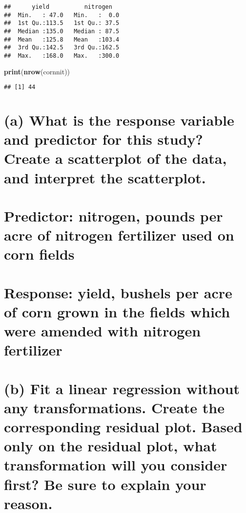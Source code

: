 \documentclass[
]{article}
\newenvironment{Shaded}{\begin{snugshade}}{\end{snugshade}}
\newcommand{\KeywordTok}[1]{\textcolor[rgb]{0.13,0.29,0.53}{\textbf{#1}}}
\newcommand{\NormalTok}[1]{#1}
\begin{document}
\begin{verbatim}
##      yield          nitrogen    
##  Min.   : 47.0   Min.   :  0.0  
##  1st Qu.:113.5   1st Qu.: 37.5  
##  Median :135.0   Median : 87.5  
##  Mean   :125.8   Mean   :103.4  
##  3rd Qu.:142.5   3rd Qu.:162.5  
##  Max.   :168.0   Max.   :300.0
\end{verbatim}

\begin{Shaded}
\begin{Highlighting}[]
\KeywordTok{print}\NormalTok{(}\KeywordTok{nrow}\NormalTok{(cornnit))}
\end{Highlighting}
\end{Shaded}

\begin{verbatim}
## [1] 44
\end{verbatim}

\hypertarget{a-what-is-the-response-variable-and-predictor-for-this-study-create-a-scatterplot-of-the-data-and-interpret-the-scatterplot.}{%
\section{(a) What is the response variable and predictor for this study?
Create a scatterplot of the data, and interpret the
scatterplot.}\label{a-what-is-the-response-variable-and-predictor-for-this-study-create-a-scatterplot-of-the-data-and-interpret-the-scatterplot.}}

\hypertarget{predictor-nitrogen-pounds-per-acre-of-nitrogen-fertilizer-used-on-corn-fields}{%
\section{Predictor: nitrogen, pounds per acre of nitrogen fertilizer
used on corn
fields}\label{predictor-nitrogen-pounds-per-acre-of-nitrogen-fertilizer-used-on-corn-fields}}

\hypertarget{response-yield-bushels-per-acre-of-corn-grown-in-the-fields-which-were-amended-with-nitrogen-fertilizer}{%
\section{Response: yield, bushels per acre of corn grown in the fields
which were amended with nitrogen
fertilizer}\label{response-yield-bushels-per-acre-of-corn-grown-in-the-fields-which-were-amended-with-nitrogen-fertilizer}}

\hypertarget{b-fit-a-linear-regression-without-any-transformations.-create-the-corresponding-residual-plot.-based-only-on-the-residual-plot-what-transformation-will-you-consider-first-be-sure-to-explain-your-reason.}{%
\section{(b) Fit a linear regression without any transformations. Create
the corresponding residual plot. Based only on the residual plot, what
transformation will you consider first? Be sure to explain your
reason.}\label{b-fit-a-linear-regression-without-any-transformations.-create-the-corresponding-residual-plot.-based-only-on-the-residual-plot-what-transformation-will-you-consider-first-be-sure-to-explain-your-reason.}}
\end{document}
